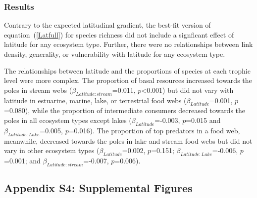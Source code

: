 \documentclass[12pt]{article}
\begin{document}
  \subsubsection*{Results}
    Contrary to the expected latitudinal gradient, the best-fit version of
    equation~(\ref{Latfull}) for species richness did not 
    include a signficant effect of latitude for any 
    ecosystem type. Further, there were no relationships
    between link density, generality, or vulnerability
    with latitude for any ecosystem type.


    The relationships between latitude and the proportions of species at each trophic level were more complex. 
    The proportion of basal resources increased towards the poles in stream webs ($\beta_{Latitude:stream}$=0.011, $p$\textless0.001) 
    but did not vary with latitude in estuarine, marine, lake, or terrestrial 
    food webs ($\beta_{Latitude}$=0.001, $p$=0.080),
    while the proportion of intermediate consumers decreased towards the poles in all ecosystem types
    except lakes ($\beta_{Latitude}$=-0.003, $p$=0.015 and
    $\beta_{Latitude:Lake}$=0.005, $p$=0.016).
    The proportion of top predators in a food web, 
    meanwhile, decreased towards the poles in lake and 
    stream food webs but did not vary in other ecosystem
    types ($\beta_{Latitude}$=0.002, $p$=0.151; 
    $\beta_{Latitude:Lake}$=-0.006, $p$=0.001; and
    $\beta_{Latitude:stream}$=-0.007, $p$=0.006).


\newpage

\subsection*{Appendix S4: Supplemental Figures}
\end{document}
